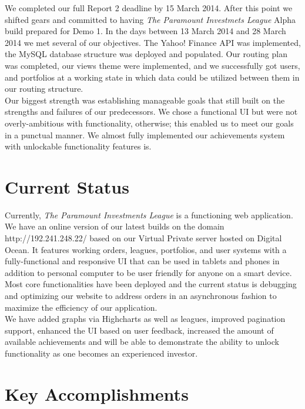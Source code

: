 We completed our full Report 2 deadline by 15 March 2014. After this point
we shifted gears and committed to having \textit{The Paramount Investmets
League} Alpha build prepared for Demo 1. In the days between 13 March 2014 and
28 March 2014 we met several of our objectives. The Yahoo! Finance API was
implemented, the MySQL database structure was deployed and populated. Our
routing plan was completed, our views theme were implemented, and we
successfully got users, and portfolios at a working state in which data could be
utilized between them in our routing structure.\\

Our biggest strength was establishing manageable goals that still built on
the strengths and failures of our predecessors. We chose a functional UI but
were not overly-ambitious with functionality, otherwise; this enabled us to meet
our goals in a punctual manner. We almost fully implemented our achievements
system with unlockable functionality features is.\\

\section{Current Status}

Currently, \textit{The Paramount Investments League} is a functioning web
application. We have an online version of our latest builds on the domain
http://192.241.248.22/ based on our Virtual Private server hosted on Digital
Ocean. It features working orders, leagues, portfolios, and user systems with a
fully-functional and responsive UI that can be used in tablets and phones in
addition to personal computer to be user friendly for anyone on a smart device.
Most core functionalities have been deployed and the current status is
debugging and optimizing our website to address orders in an asynchronous fashion
to maximize the efficiency of our application.\\

We have added graphs via Highcharts as well as leagues, improved pagination
support, enhanced the UI based on user feedback, increased the amount of
available achievements and will be able to demonstrate the ability to unlock
functionality as one becomes an experienced investor.\\

\section{Key Accomplishments}

